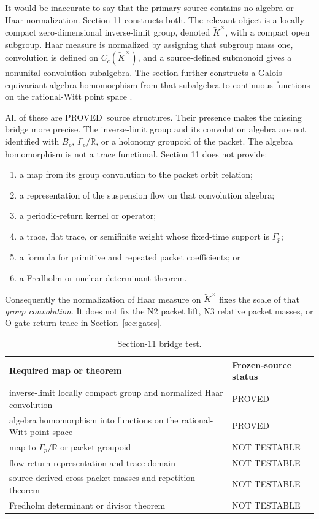 \documentclass[11pt]{article}
\theoremstyle{definition}
\theoremstyle{remark}
\newcommand{\R}{\mathbb{R}}
\newcommand{\proved}{\textsf{PROVED}}
\newcommand{\nottest}{\textsf{NOT TESTABLE}}
\begin{document}
It would be inaccurate to say that the primary source contains no algebra or
Haar normalization.  Section 11 constructs both.  The relevant object is a
locally compact zero-dimensional inverse-limit group, denoted
\(\overleftarrow K^{\times}\), with a compact open subgroup.  Haar measure is
normalized by assigning that subgroup mass one, convolution is defined on
\(C_c(\overleftarrow K^{\times})\), and a source-defined submonoid gives a
nonunital convolution subalgebra.  The section further constructs a
Galois-equivariant algebra homomorphism from that subalgebra to continuous
functions on the rational-Witt point space \citep{Deninger2026}.

All of these are \proved\ source structures.  Their presence makes the missing
bridge more precise.  The inverse-limit group and its convolution algebra are
not identified with \(B_p\), \(\Gamma_p/\R\), or a holonomy groupoid of the
packet.  The algebra homomorphism is not a trace functional.  Section 11 does
not provide:
\begin{enumerate}[leftmargin=*,itemsep=2pt]
 \item a map from its group convolution to the packet orbit relation;
 \item a representation of the suspension flow on that convolution algebra;
 \item a periodic-return kernel or operator;
 \item a trace, flat trace, or semifinite weight whose fixed-time support is
 \(\Gamma_p\);
 \item a formula for primitive and repeated packet coefficients; or
 \item a Fredholm or nuclear determinant theorem.
\end{enumerate}
Consequently the normalization of Haar measure on
\(\overleftarrow K^{\times}\) fixes the scale of that \emph{group
convolution}.  It does not fix the N2 packet lift, N3 relative packet masses,
or O-gate return trace in Section~\ref{sec:gates}.

\begin{table}[ht]
\centering
\caption{Section-11 bridge test.}
\label{tab:section11}
\begin{tabularx}{\textwidth}{X p{}}
\toprule
Required map or theorem & Frozen-source status\\
\midrule
inverse-limit locally compact group and normalized Haar convolution & \proved\\
algebra homomorphism into functions on the rational-Witt point space & \proved\\
map to \(\Gamma_p/\R\) or packet groupoid & \nottest\\
flow-return representation and trace domain & \nottest\\
source-derived cross-packet masses and repetition theorem & \nottest\\
Fredholm determinant or divisor theorem & \nottest\\
\bottomrule
\end{tabularx}
\end{table}
\end{document}
